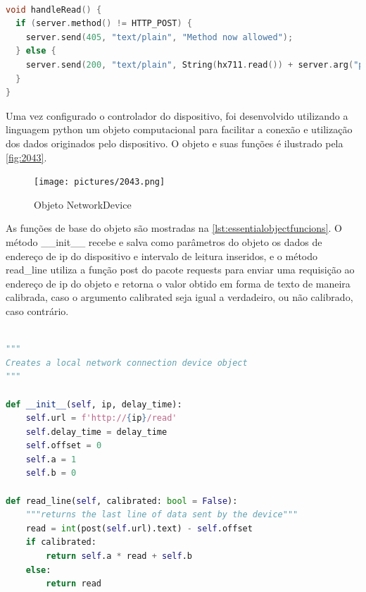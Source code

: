\begin{lstlisting}[label={lst:handle_read},language=C++,caption={[Controller Program]{Função de obtenção de sinal pelo amplificador HX711}}]

void handleRead() {
  if (server.method() != HTTP_POST) {
    server.send(405, "text/plain", "Method now allowed");
  } else {
    server.send(200, "text/plain", String(hx711.read()) + server.arg("plain"));
  }
}

\end{lstlisting}

Uma vez configurado o controlador do dispositivo, foi desenvolvido utilizando a linguagem python um objeto computacional
para facilitar a conexão e utilização dos dados originados pelo dispositivo.
O objeto e suas funções é ilustrado pela \autoref{fig:2043}.

\begin{figure}[htb]
	\caption{\label{fig:2043} Objeto NetworkDevice}
	\begin{center}
		\texttt{[image: pictures/2043.png]}
	\end{center}
\end{figure}

As funções de base do objeto são mostradas na \autoref{lst:essentialobjectfuncions}.
O método \_\_init\_\_ recebe e salva como parâmetros do objeto os dados de endereço de ip do dispositivo e intervalo de leitura inseridos,
e o método read\_line utiliza a função post do pacote requests para enviar uma requisição ao endereço de ip do objeto e retorna o valor obtido em forma de
texto de maneira calibrada, caso o argumento calibrated seja igual a verdadeiro, ou não calibrado, caso contrário.

\begin{lstlisting}[label={lst:essentialobjectfuncions},language=Python,caption={[NetworkDevice]{Métodos base do objeto NetworkDevice}}]

"""
Creates a local network connection device object
"""

def __init__(self, ip, delay_time):
	self.url = f'http://{ip}/read'
	self.delay_time = delay_time
	self.offset = 0
	self.a = 1
	self.b = 0

def read_line(self, calibrated: bool = False):
	"""returns the last line of data sent by the device"""
	read = int(post(self.url).text) - self.offset
	if calibrated:
		return self.a * read + self.b
	else:
		return read

\end{lstlisting}

